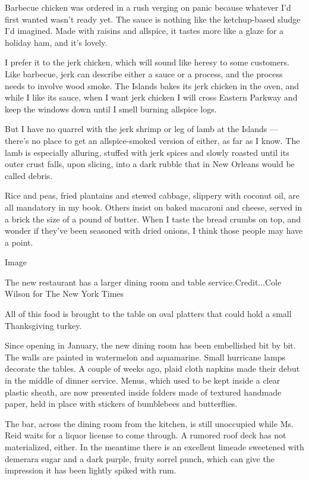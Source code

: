 Barbecue chicken was ordered in a rush verging on panic because whatever
I'd first wanted wasn't ready yet. The sauce is nothing like the
ketchup-based sludge I'd imagined. Made with raisins and allspice, it
tastes more like a glaze for a holiday ham, and it's lovely.

I prefer it to the jerk chicken, which will sound like heresy to some
customers. Like barbecue, jerk can describe either a sauce or a process,
and the process needs to involve wood smoke. The Islands bakes its jerk
chicken in the oven, and while I like its sauce, when I want jerk
chicken I will cross Eastern Parkway and keep the windows down until I
smell burning allspice logs.

But I have no quarrel with the jerk shrimp or leg of lamb at the Islands
--- there's no place to get an allspice-smoked version of either, as far
as I know. The lamb is especially alluring, stuffed with jerk spices and
slowly roasted until its outer crust falls, upon slicing, into a dark
rubble that in New Orleans would be called debris.

Rice and peas, fried plantains and stewed cabbage, slippery with coconut
oil, are all mandatory in my book. Others insist on baked macaroni and
cheese, served in a brick the size of a pound of butter. When I taste
the bread crumbs on top, and wonder if they've been seasoned with dried
onions, I think those people may have a point.

Image

The new restaurant has a larger dining room and table
service.Credit...Cole Wilson for The New York Times

All of this food is brought to the table on oval platters that could
hold a small Thanksgiving turkey.

Since opening in January, the new dining room has been embellished bit
by bit. The walls are painted in watermelon and aquamarine. Small
hurricane lamps decorate the tables. A couple of weeks ago, plaid cloth
napkins made their debut in the middle of dinner service. Menus, which
used to be kept inside a clear plastic sheath, are now presented inside
folders made of textured handmade paper, held in place with stickers of
bumblebees and butterflies.

The bar, across the dining room from the kitchen, is still unoccupied
while Ms. Reid waits for a liquor license to come through. A rumored
roof deck has not materialized, either. In the meantime there is an
excellent limeade sweetened with demerara sugar and a dark purple,
fruity sorrel punch, which can give the impression it has been lightly
spiked with rum.

